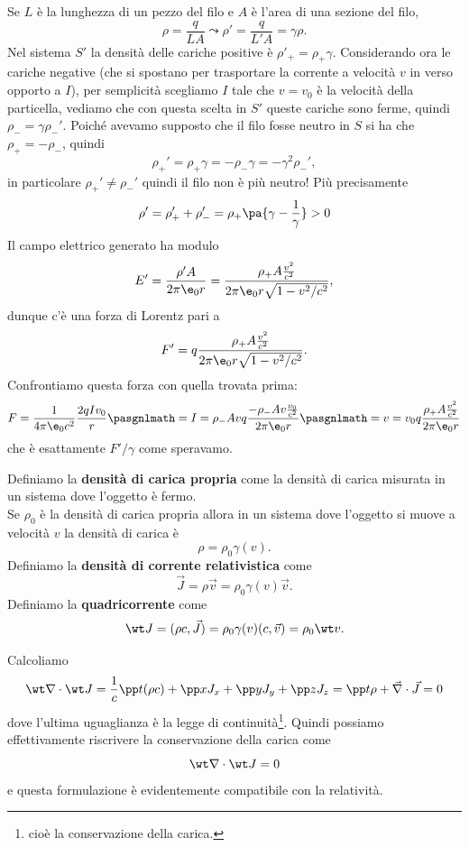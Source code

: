 \begin{example}
\noindent
Se $L$ \`e la lunghezza di un pezzo del filo e $A$ \`e l'area di una sezione del filo,
\[\rho=\frac q{LA}\leadsto \rho'=\frac q{L'A}=\gamma \rho.\]
Nel sistema $S'$ la densit\`a delle cariche positive \`e $\rho'_+=\rho_+\gamma$. Considerando ora le cariche negative (che si spostano per trasportare la corrente a velocit\`a $v$ in verso opporto a $I$), per semplicit\`a scegliamo $I$ tale che $v=v_0$ \`e la velocit\`a della particella, vediamo che con questa scelta in $S'$ queste cariche sono ferme, quindi $\rho_-=\gamma \rho_-'$. Poich\'e avevamo supposto che il filo fosse neutro in $S$ si ha che $\rho_+=-\rho_-$, quindi \[\rho_+'=\rho_+\gamma=-\rho_-\gamma=-\gamma^2\rho_-',\]
in particolare $\rho_+'\neq \rho_-'$ quindi il filo non \`e pi\`u neutro! Pi\`u precisamente
\[\rho'=\rho'_++\rho_-'=\rho_+\pa{\gamma-\frac1\gamma}>0\]
Il campo elettrico generato ha modulo
\[E'=\frac{\rho' A}{2\pi\e_0r}=\frac{\rho_+A\frac{v^2}{c^2}}{2\pi\e_0 r\sqrt{1-v^2/c^2}},\]
dunque c'\`e una forza di Lorentz pari a 
\[F'=q\frac{\rho_+A\frac{v^2}{c^2}}{2\pi\e_0 r\sqrt{1-v^2/c^2}}.\]
Confrontiamo questa forza con quella trovata prima:
\[F=\frac1{4\pi \e_0c^2}\frac{2 qIv_0}r\pasgnlmath={I=\rho_-Av}q\frac{-\rho_- Av \frac{v_0}{c^2}}{2\pi \e_0 r}\pasgnlmath={v=v_0}q\frac{\rho_+ A \frac{v^2}{c^2}}{2\pi \e_0 r}\]
che \`e esattamente $F'/\gamma$ come speravamo.
\end{example}

\begin{definition}
Definiamo la \textbf{densit\`a di carica propria} come la densit\`a di carica misurata in un sistema dove l'oggetto \`e fermo.\\
Se $\rho_0$ \`e la densit\`a di carica propria allora in un sistema dove l'oggetto si muove a velocit\`a $v$ la densit\`a di carica \`e
\[\rho=\rho_0\gamma(v).\]
Definiamo la \textbf{densit\`a di corrente relativistica} come
\[\vec J=\rho\vec v=\rho_0\gamma(v)\vec v.\]
Definiamo la \textbf{quadricorrente} come
\[\wt J=(\rho c,\vec J)=\rho_0\gamma(v)(c,\vec v)=\rho_0\wt v.\]
\end{definition}


\begin{remark}
Calcoliamo
\[\wt \nabla \cdot \wt J=\frac1c\pp t{(\rho c)}+\pp x{J_x}+\pp y{J_y}+\pp z{J_z}=\pp t\rho+\vec\nabla \cdot \vec J=0\]
dove l'ultima uguaglianza \`e la legge di continuit\`a\footnote{cio\`e la conservazione della carica.}. Quindi possiamo effettivamente riscrivere la conservazione della carica come
\[\wt\nabla\cdot \wt J=0\]
e questa formulazione \`e evidentemente compatibile con la relativit\`a.
\end{remark}

